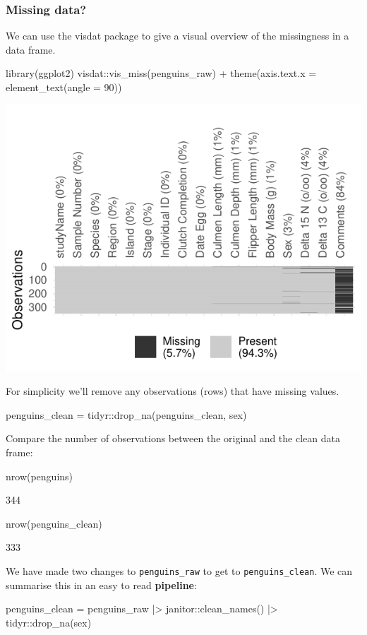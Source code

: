 \documentclass[a4paper]{article}\usepackage[]{graphicx}\usepackage[]{xcolor}
\makeatletter
\def\maxwidth{ %
  \ifdim\Gin@nat@width>\linewidth
    \linewidth
  \else
    \Gin@nat@width
  \fi
}
\makeatother
\begin{document}
\subsubsection{Missing data?}
We can use the visdat package to give a visual overview of the missingness in a data frame.
\begin{Schunk}
\begin{Sinput}
library(ggplot2)
visdat::vis_miss(penguins_raw) + theme(axis.text.x = element_text(angle = 90))
\end{Sinput}


{\centering \includegraphics[width=\maxwidth]{figure/listings-par_mar_c_2_2_2_2__-1} 

}

\end{Schunk}
For simplicity we'll remove any observations (rows) that have missing values.
\begin{Schunk}
\begin{Sinput}
penguins_clean = tidyr::drop_na(penguins_clean, sex)
\end{Sinput}
\end{Schunk}
Compare the number of observations between the original and the clean data frame:
\begin{Schunk}
\begin{Sinput}
nrow(penguins)
\end{Sinput}
\begin{Soutput}
[1] 344
\end{Soutput}
\end{Schunk}
\begin{Schunk}
\begin{Sinput}
nrow(penguins_clean)
\end{Sinput}
\begin{Soutput}
[1] 333
\end{Soutput}
\end{Schunk}
We have made two changes to \lstinline|penguins_raw| to get to \lstinline|penguins_clean|. We can summarise this in an easy to read \textbf{pipeline}:
\begin{Schunk}
\begin{Sinput}
penguins_clean = penguins_raw |>
  janitor::clean_names() |>
  tidyr::drop_na(sex)
\end{Sinput}
\end{Schunk}
\end{document}
